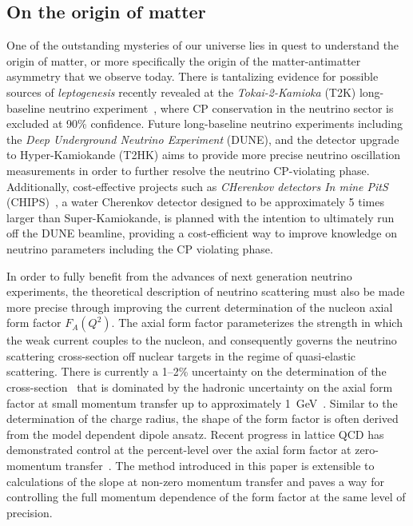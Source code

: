 \documentclass[prd,aps,twocolumn,superscriptaddress,tightenlines,nofootinbib,floatfix,preprintnumbers,10pt]{revtex4-1}
\begin{document}
\subsection{On the origin of matter}
One of the outstanding mysteries of our universe lies in quest to
understand the origin of matter, or more specifically the origin of
the matter-antimatter asymmetry that we observe today. There is
tantalizing evidence for possible sources of \textit{leptogenesis}
recently revealed at the \textit{Tokai-2-Kamioka} (T2K) long-baseline
neutrino experiment~\cite{Abe:2017uxa}, where CP conservation in the
neutrino sector is excluded at 90\% confidence.  Future long-baseline
neutrino experiments including the \textit{Deep Underground Neutrino
  Experiment} (DUNE), and the detector upgrade to Hyper-Kamiokande
(T2HK) aims to provide more precise neutrino oscillation measurements
in order to further resolve the neutrino CP-violating
phase. Additionally, cost-effective projects such as \textit{CHerenkov
  detectors In mine PitS} (CHIPS)~\cite{Adamson:2013xka}, a water
Cherenkov detector designed to be approximately 5 times larger than
Super-Kamiokande, is planned with the intention to ultimately run off
the DUNE beamline, providing a cost-efficient way to improve knowledge
on neutrino parameters including the CP violating phase.

In order to fully benefit from the advances of next generation
neutrino experiments, the theoretical description of neutrino
scattering must also be made more precise through improving the
current determination of the nucleon axial form factor $F_A(Q^2)$. The
axial form factor parameterizes the strength in which the weak current
couples to the nucleon, and consequently governs the neutrino
scattering cross-section off nuclear targets in the regime of
quasi-elastic scattering. There is currently a 1--2\% uncertainty on
the determination of the cross-section~\cite{Adams:2013qkq} that is
dominated by the hadronic uncertainty on the axial form factor at
small momentum transfer up to approximately
1~GeV~\cite{Day:2012gb}. Similar to the determination of the charge
radius, the shape of the form factor is often derived from the model
dependent dipole ansatz. Recent progress in lattice QCD has
demonstrated control at the percent-level over the axial form factor
at zero-momentum transfer~\cite{Chang:2017oll}. The method introduced
in this paper is extensible to calculations of the slope at non-zero
momentum transfer and paves a way for controlling the full momentum
dependence of the form factor at the same level of precision.
\end{document}
